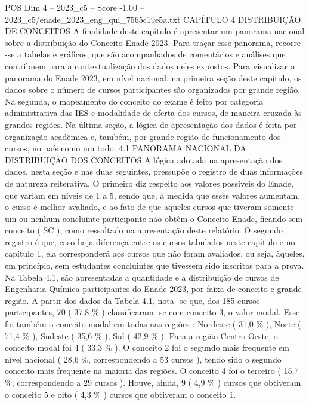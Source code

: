 \begin{textsample}{POS Dim 4 – 2023\_c5 – Score -1.00 – 2023\_c5/enade\_2023\_eng\_qui\_7565c19e5a.txt}  \label{ex:f4_pos_270}
CAPÍTULO 4 DISTRIBUIÇÃO DE CONCEITOS A finalidade deste capítulo é apresentar um panorama nacional sobre a distribuição do Conceito Enade 2023.
Para traçar esse panorama, recorre -se a tabelas e gráficos, que são acompanhados de comentários e análises que contribuem para a contextualização dos dados neles expostos.
Para visualizar o panorama do Enade 2023, em nível nacional, na primeira seção deste capítulo, os dados sobre o número de cursos participantes são organizados por grande região.
Na segunda, o mapeamento do conceito do exame é feito por categoria administrativa das IES e modalidade de oferta dos cursos, de maneira cruzada às grandes regiões.
Na última seção, a lógica de apresentação dos dados é feita por organização acadêmica e, também, por grande região de funcionamento dos cursos, no país como um todo. 4.1 PANORAMA NACIONAL DA DISTRIBUIÇÃO DOS CONCEITOS A lógica adotada na apresentação dos dados, nesta seção e nas duas seguintes, pressupõe o registro de duas informações de natureza reiterativa.
O primeiro diz respeito aos valores possíveis do Enade, que variam em níveis de 1 a 5, sendo que, à medida que esses valores aumentam, o curso é melhor avaliado, e ao fato de que aqueles cursos que tiveram somente um ou nenhum concluinte participante não obtêm o Conceito Enade, ficando sem conceito ( SC ), como ressaltado na apresentação deste relatório.
O segundo registro é que, caso haja diferença entre os cursos tabulados neste capítulo e no capítulo 1, ela corresponderá aos cursos que não foram avaliados, ou seja, àqueles, em princípio, sem estudantes concluintes que tivessem sido inscritos para a prova.
Na Tabela 4.1, são apresentadas a quantidade e a distribuição de cursos de Engenharia Química participantes do Enade 2023, por faixa de conceito e grande região.
A partir dos dados da Tabela 4.1, nota -se que, dos 185 cursos participantes, 70 ( 37,8 \% ) classificaram -se com conceito 3, o valor modal.
Esse foi também o conceito modal em todas nas regiões : Nordeste ( 31,0 \% ), Norte ( 71,4 \% ), Sudeste ( 35,6 \% ), Sul ( 42,9 \% ).
Para a região Centro-Oeste, o conceito modal foi 4 ( 33,3 \% ).
O conceito 2 foi o segundo mais frequente em nível nacional ( 28,6 \%, correspondendo a 53 cursos ), tendo sido o segundo conceito mais frequente na maioria das regiões.
O conceito 4 foi o terceiro ( 15,7 \%, correspondendo a 29 cursos ).
Houve, ainda, 9 ( 4,9 \% ) cursos que obtiveram o conceito 5 e oito ( 4,3 \% ) cursos que obtiveram o conceito 1.

\end{textsample}
